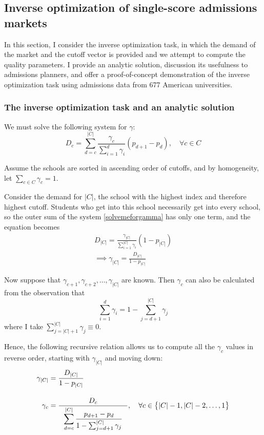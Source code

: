 \documentclass[12pt]{article}
\theoremstyle{definition}
\begin{document}
\subsection{Inverse optimization of single-score admissions markets}
In this section, I consider the inverse optimization task, in which the demand of the market and the cutoff vector is provided and we attempt to compute the quality parameters. I provide an analytic solution, discussion its usefulness to admissions planners, and offer a proof-of-concept demonstration of the inverse optimization task using admissions data from 677 American universities. 

\subsubsection{The inverse optimization task and an analytic solution}
We must solve the following system for $\gamma$:
\begin{equation}
D_c = \sum_{d=c}^{|C|} 
\frac{\gamma_c}{ \sum_{i=1}^d \gamma_i} 
\left(p_{d+1} - p_{d}\right),
\quad \forall c \in C
 \label{solvemeforgamma}
 \end{equation}

Assume the schools are sorted in ascending order of cutoffs, and by homogeneity, let $\sum_{c \in C} \gamma_c = 1$.

Consider the demand for $|C|$, the school with the highest index and therefore highest cutoff. Students who get into this school necessarily get into every school, so the outer sum of the system \eqref{solvemeforgamma} has only one term, and the equation becomes
\begin{align}D_{|C|} =
\frac{\gamma_{|C|}}{ \sum_{i=1}^{|C|} \gamma_i} 
\left(1 - p_{|C|}\right) \\
\implies \gamma_{|C|} = \frac{D_{|C|}}{1 - p_{|C|}}
\end{align}

Now suppose that $\gamma_{c+1}, \gamma_{c+2}, \dots, \gamma_{|C|}$ are known. Then $\gamma_c$ can also be calculated from the observation that
\[\sum_{i=1}^d \gamma_i = 1 - \sum_{j=d+1}^{|C|} \gamma_j\]
where I take $\sum_{j=|C|+1}^{|C|} \gamma_j \equiv 0$.

Hence, the following recursive relation allows us to compute all the $\gamma_c$ values in reverse order, starting with $\gamma_{|C|}$ and moving down:
\begin{align}
\gamma_{|C|} &= \frac{D_{|C|}}{1 - p_{|C|}} \\[1em]
\gamma_c &= \frac{D_c}{~~\mathlarger{\sum_{d=c}^{|C|} \frac{p_{d+1} - p_d}{1 - \sum_{j=d+1}^{|C|} \gamma_j} ~~}}, \quad \forall c \in \bigl\{ |C|-1, |C|-2, \dots, 1\bigr\} \label{gammarecursion}
\end{align}
\end{document}
